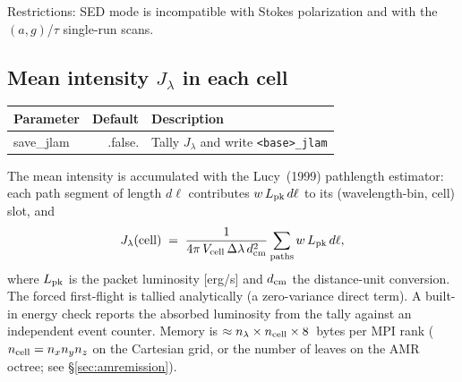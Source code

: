 \documentclass[english,a4paper]{kiseon_memo}
\newcommand{\file}[1]{\texttt{#1}}
\begin{document}
\medskip\noindent
Restrictions: SED mode is incompatible with Stokes polarization and with the
$(a,g)$/$\tau$ single-run scans.

\subsection{Mean intensity $J_\lambda$ in each cell}\label{sec:jlam}
\nopagebreak
\begin{center}
\begin{tabular}{P D X}
\toprule
\textrm{Parameter} & \textrm{Default} & \textrm{Description}\\
\midrule
save\_jlam         & .false. & Tally $J_\lambda$ and write \file{<base>\_jlam}\\
\bottomrule
\end{tabular}
\end{center}
The mean intensity is accumulated with the Lucy~(1999) pathlength estimator:
each path segment of length $d\ell$ contributes $w\,L_{\rm pk}\,d\ell$ to its
(wavelength-bin, cell) slot, and
\begin{equation}
  J_\lambda(\mathrm{cell}) \;=\;
  \frac{1}{4\pi\,V_{\rm cell}\,\Delta\lambda\,d_{\rm cm}^2}
  \sum_{\rm paths} w\,L_{\rm pk}\,d\ell,
\end{equation}
where $L_{\rm pk}$ is the packet luminosity [erg/s] and $d_{\rm cm}$ the
distance-unit conversion.  The forced first-flight is tallied analytically
(a zero-variance direct term).  A built-in energy check reports the absorbed
luminosity from the tally against an independent event counter.  Memory is
$\approx n_\lambda\times n_{\rm cell}\times 8$~bytes per MPI rank
($n_{\rm cell}=n_x n_y n_z$ on the Cartesian grid, or the number of leaves on
the AMR octree; see \S\ref{sec:amremission}).
\end{document}

